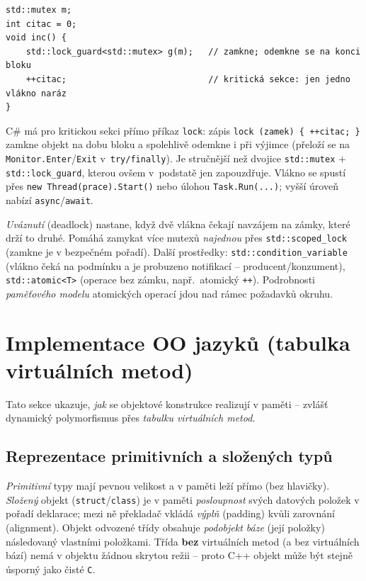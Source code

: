 \documentclass[11pt,a4paper]{article}
\newcommand{\cd}{\lstinline[style=cpp]}
\begin{document}
\begin{lstlisting}[style=cpp]
std::mutex m;
int citac = 0;
void inc() {
    std::lock_guard<std::mutex> g(m);   // zamkne; odemkne se na konci bloku
    ++citac;                            // kritická sekce: jen jedno vlákno naráz
}
\end{lstlisting}

\begin{csalt}
C\# má pro kritickou sekci přímo příkaz \cd{lock}: zápis \lstinline[style=cs]!lock (zamek) { ++citac; }! zamkne objekt na dobu bloku a spolehlivě odemkne i při výjimce (přeloží se na \texttt{Monitor.Enter}/\texttt{Exit} v~\texttt{try/finally}). Je stručnější než dvojice \cd{std::mutex} $+$ \cd{std::lock_guard}, kterou ovšem v~podstatě jen zapouzdřuje. Vlákno se spustí přes \lstinline[style=cs]!new Thread(prace).Start()! nebo úlohou \lstinline[style=cs]!Task.Run(...)!; vyšší úroveň nabízí \cd{async}/\cd{await}.
\end{csalt}

\begin{poznamka}
\emph{Uváznutí} (deadlock) nastane, když dvě vlákna čekají navzájem na zámky, které drží to druhé. Pomáhá zamykat více mutexů \emph{najednou} přes \cd{std::scoped_lock} (zamkne je v bezpečném pořadí). Další prostředky: \cd{std::condition_variable} (vlákno čeká na podmínku a je probuzeno notifikací -- producent/konzument), \cd{std::atomic<T>} (operace bez zámku, např.\ atomický \cd{++}). Podrobnosti \emph{paměťového modelu} atomických operací jdou nad rámec požadavků okruhu.
\end{poznamka}

\section{Implementace OO jazyků (tabulka virtuálních metod)}

Tato sekce ukazuje, \emph{jak} se objektové konstrukce realizují v paměti -- zvlášť dynamický polymorfismus přes \emph{tabulku virtuálních metod}.

\subsection{Reprezentace primitivních a složených typů}

\begin{poznamka}
\emph{Primitivní} typy mají pevnou velikost a v paměti leží přímo (bez hlavičky). \emph{Složený} objekt (\cd{struct}/\cd{class}) je v paměti \emph{posloupnost} svých datových položek v pořadí deklarace; mezi ně překladač vkládá \emph{výplň} (padding) kvůli zarovnání (alignment). Objekt odvozené třídy obsahuje \emph{podobjekt báze} (její položky) následovaný vlastními položkami. Třída \textbf{bez} virtuálních metod (a bez virtuálních bází) nemá v objektu žádnou skrytou režii -- proto C++ objekt může být stejně úsporný jako čisté \texttt{C}.
\end{poznamka}
\end{document}
